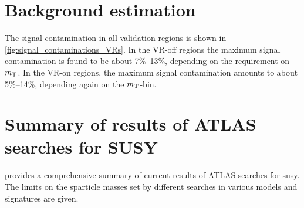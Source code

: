 \graphicspath{{chapter-background/Figs/}}

\section{Background estimation}\label{app:background_estimation}

The signal contamination in all validation regions is shown in \cref{fig:signal_contaminations_VRs}. In the VR-off regions the maximum signal contamination is found to be about 7\%--13\%, depending on the requirement on $m_{\textrm{T}}$. In the VR-on regions, the maximum signal contamination amounts to about 5\%--14\%, depending again on the $m_{\textrm{T}}$-bin.


\section{Summary of results of ATLAS searches for SUSY}\label{sec:susy_summary_plot}

 provides a comprehensive summary of current results of ATLAS searches for \gls{susy}. The limits on the sparticle masses set by different searches in various models and signatures are given.


